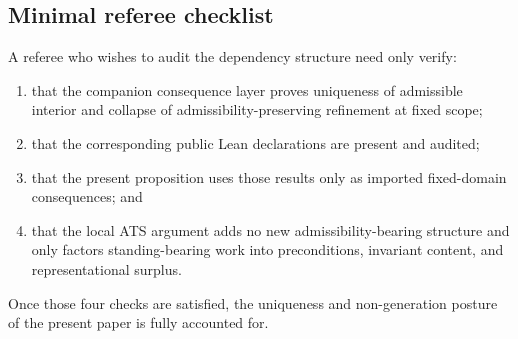 \documentclass[12pt]{article}
\theoremstyle{plain}
\begin{document}
\subsection*{Minimal referee checklist}
A referee who wishes to audit the dependency structure need only verify:
\begin{enumerate}[leftmargin=*]
    \item that the companion consequence layer proves uniqueness of admissible interior and collapse of admissibility-preserving refinement at fixed scope;
    \item that the corresponding public Lean declarations are present and audited;
    \item that the present proposition uses those results only as imported fixed-domain consequences; and
    \item that the local ATS argument adds no new admissibility-bearing structure and only factors standing-bearing work into preconditions, invariant content, and representational surplus.
\end{enumerate}
Once those four checks are satisfied, the uniqueness and non-generation posture of the present paper is fully accounted for.
\end{document}
